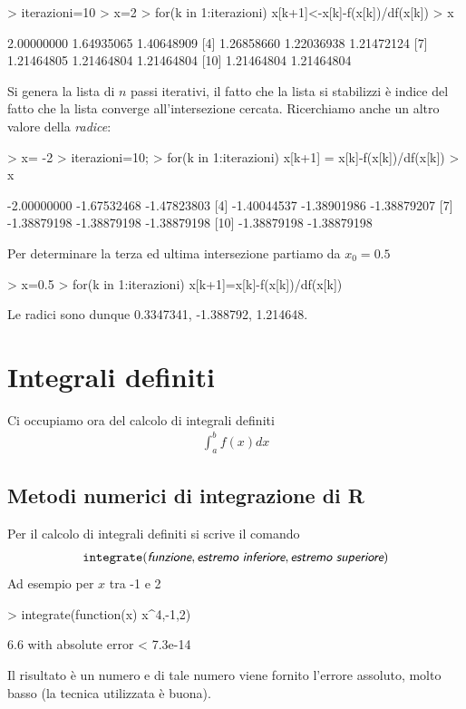 \documentclass[onecolumn,11pt]{book}
\newcommand{\varia}[1]{\textsl{\textsf{#1}}}
\begin{document}
\begin{Schunk}
\begin{Sinput}
> iterazioni=10
> x=2
> for(k in 1:iterazioni) x[k+1]<-x[k]-f(x[k])/df(x[k])
> x
\end{Sinput}
\begin{Soutput}
 [1] 2.00000000 1.64935065 1.40648909
 [4] 1.26858660 1.22036938 1.21472124
 [7] 1.21464805 1.21464804 1.21464804
[10] 1.21464804 1.21464804
\end{Soutput}
\end{Schunk}
Si genera la lista di $n$ passi iterativi, il fatto che la lista si stabilizzi \`e indice del fatto che la lista converge all'intersezione cercata.  Ricerchiamo anche un altro valore della {\it radice}:
\begin{Schunk}
\begin{Sinput}
> x= -2
> iterazioni=10;
> for(k in 1:iterazioni) x[k+1] = x[k]-f(x[k])/df(x[k])
> x
\end{Sinput}
\begin{Soutput}
 [1] -2.00000000 -1.67532468 -1.47823803
 [4] -1.40044537 -1.38901986 -1.38879207
 [7] -1.38879198 -1.38879198 -1.38879198
[10] -1.38879198 -1.38879198
\end{Soutput}
\end{Schunk}
Per determinare la terza ed ultima intersezione partiamo da $x_0=0.5$
\begin{Schunk}
\begin{Sinput}
> x=0.5
> for(k in 1:iterazioni) x[k+1]=x[k]-f(x[k])/df(x[k])
\end{Sinput}
\end{Schunk}
Le radici sono dunque 0.3347341, -1.388792, 1.214648.


\section{Integrali definiti}
Ci occupiamo ora del calcolo di integrali definiti
\begin{eqnarray*}
\int_a^b f(x)dx
\end{eqnarray*}

\subsection{Metodi numerici di integrazione di \textsf{R}}
Per il calcolo di integrali definiti si scrive il comando
\begin{eqnarray*}
\texttt{integrate}(\varia{funzione},
\varia{estremo inferiore}, \varia{estremo superiore})
\end{eqnarray*}
Ad esempio per $x$ tra -1 e 2
\begin{Schunk}
\begin{Sinput}
> integrate(function(x) x^4,-1,2)
\end{Sinput}
\begin{Soutput}
6.6 with absolute error < 7.3e-14
\end{Soutput}
\end{Schunk}
Il risultato \`e un numero e di tale numero viene fornito l'errore assoluto, molto basso (la tecnica utilizzata \`e buona).
\end{document}
